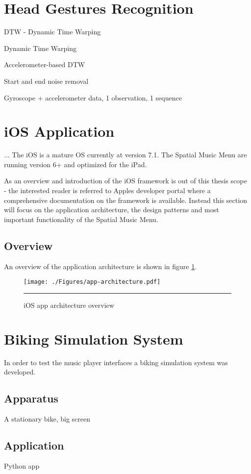 \section{Head Gestures Recognition}

DTW - Dynamic Time Warping 

Dynamic Time Warping \cite{salvador_toward_2007}

Accelerometer-based DTW \cite{akl_accelerometer-based_2010}

Start and end noise removal

Gyroscope + accelerometer data, 1 observation, 1 sequence


\section{iOS Application}
...
The iOS is a mature OS currently at version 7.1. The Spatial Music Menu are running version 6+ and optimized for the iPad.

As an overview and introduction of the iOS framework is out of this thesis scope - the interested reader is referred to Apples developer portal \cite{apple_apple_2014} where a comprehensive documentation on the framework is available. Instead this section will focus on the application architecture, the design patterns and most important functionality of the Spatial Music Menu.

\subsection{Overview}
An overview of the application architecture is shown in figure \ref{fig:apparchitecture}.

\begin{figure}[htbp]
	\centering
		\texttt{[image: ./Figures/app-architecture.pdf]}
		\rule{35em}{1pt}
	\caption[App architecture]{iOS app architecture overview}
	\label{fig:apparchitecture}
\end{figure}


\section{Biking Simulation System}
In order to test the music player interfaces a biking simulation system was developed.

\subsection{Apparatus}
A stationary bike, big screen

\subsection{Application}

Python app





